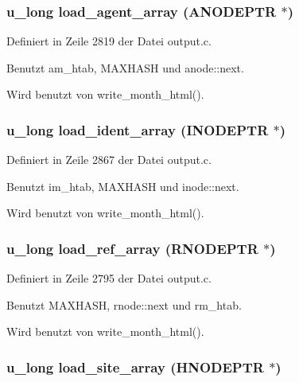 \subsubsection{\setlength{\rightskip}{0pt plus 5cm}u\_\-long load\_\-agent\_\-array ({\bf ANODEPTR} $\ast$)}\label{output_8c_695c31f8c5d53bf9a1b112cccd36740f}




Definiert in Zeile 2819 der Datei output.c.

Benutzt am\_\-htab, MAXHASH und anode::next.

Wird benutzt von write\_\-month\_\-html().
\subsubsection{\setlength{\rightskip}{0pt plus 5cm}u\_\-long load\_\-ident\_\-array ({\bf INODEPTR} $\ast$)}\label{output_8c_78caf44e7545035a80e85f498cb9e471}




Definiert in Zeile 2867 der Datei output.c.

Benutzt im\_\-htab, MAXHASH und inode::next.

Wird benutzt von write\_\-month\_\-html().
\subsubsection{\setlength{\rightskip}{0pt plus 5cm}u\_\-long load\_\-ref\_\-array ({\bf RNODEPTR} $\ast$)}\label{output_8c_4fe67ad14b790d3dabec4fc028e338c5}




Definiert in Zeile 2795 der Datei output.c.

Benutzt MAXHASH, rnode::next und rm\_\-htab.

Wird benutzt von write\_\-month\_\-html().
\subsubsection{\setlength{\rightskip}{0pt plus 5cm}u\_\-long load\_\-site\_\-array ({\bf HNODEPTR} $\ast$)}\label{output_8c_12790ed69b92f9024071f8e8ba312ee3}




